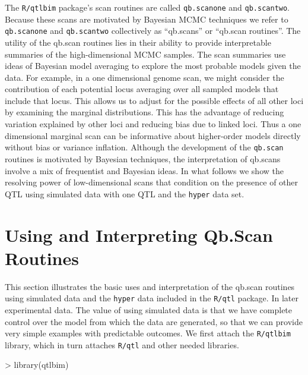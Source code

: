 \documentclass[12pt]{article}
\begin{document}
The {\tt R/qtlbim} package's scan routines  are called  {\tt qb.scanone} 
and {\tt qb.scantwo}.  Because these scans are motivated by Bayesian 
MCMC techniques we refer to {\tt qb.scanone} and {\tt qb.scantwo} 
collectively as ``qb.scans'' or ``qb.scan routines''.    The utility of 
the qb.scan routines lies in their ability to provide interpretable 
summaries of the high-dimensional MCMC samples.  The scan summaries use 
ideas of Bayesian model  averaging to explore the most probable models 
given the data.  For example, in a one dimensional genome scan, we 
might consider the contribution of each potential locus averaging over 
all  sampled models that include  that locus. This allows us to  adjust 
for the possible effects of all other loci by examining the marginal  
distributions. This has the advantage of reducing variation explained 
by other loci and reducing bias due to  linked loci.  Thus a one 
dimensional marginal scan can be informative about higher-order models 
directly without bias or variance inflation.  Although the development 
of the {\tt qb.scan} routines is motivated by Bayesian techniques, the 
interpretation of qb.scans  involve a mix of frequentist and Bayesian 
ideas.  In what follows we show the  
resolving power of low-dimensional scans that condition on the presence 
of  other QTL using simulated data with  one QTL and the {\tt hyper} 
data set.


\section{Using and Interpreting Qb.Scan Routines}
This section illustrates the basic uses and interpretation of the qb.scan 
routines using simulated data and the {\tt hyper}  data included in
the {\tt R/qtl} package. In later  experimental data.  The value of
using simulated data is that we have complete control over the model
from which the data are generated, so that we can provide very simple
examples with predictable outcomes. We first attach the {\tt R/qtlbim}
library, which in turn attaches {\tt R/qtl} and other needed
libraries.
\begin{Schunk}
\begin{Sinput}
> library(qtlbim)
\end{Sinput}
\end{Schunk}
\end{document}
